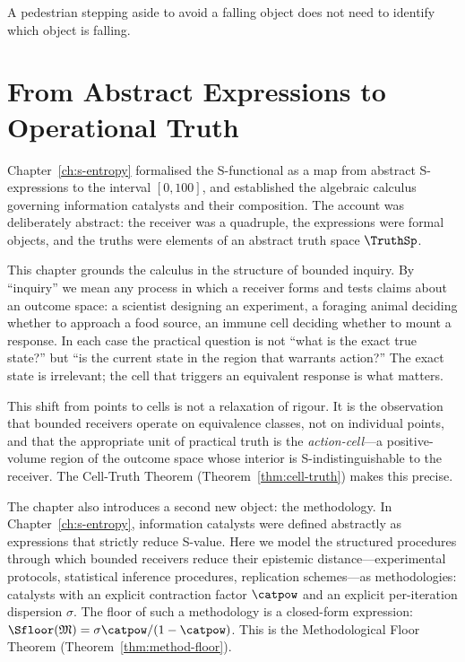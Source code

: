 \epigraph{A pedestrian stepping aside to avoid a falling object does not need to identify which object is falling.}{}


\section{From Abstract Expressions to Operational Truth}
\label{sec:ch2-intro}

Chapter~\ref{ch:s-entropy} formalised the S-functional as a map from abstract S-expressions to the interval $[0, 100]$, and established the algebraic calculus governing information catalysts and their composition. The account was deliberately abstract: the receiver was a quadruple, the expressions were formal objects, and the truths were elements of an abstract truth space $\TruthSp$.

This chapter grounds the calculus in the structure of bounded inquiry. By ``inquiry'' we mean any process in which a receiver forms and tests claims about an outcome space: a scientist designing an experiment, a foraging animal deciding whether to approach a food source, an immune cell deciding whether to mount a response. In each case the practical question is not ``what is the exact true state?'' but ``is the current state in the region that warrants action?'' The exact state is irrelevant; the cell that triggers an equivalent response is what matters.

This shift from points to cells is not a relaxation of rigour. It is the observation that bounded receivers operate on equivalence classes, not on individual points, and that the appropriate unit of practical truth is the \emph{action-cell}---a positive-volume region of the outcome space whose interior is S-indistinguishable to the receiver. The Cell-Truth Theorem (Theorem~\ref{thm:cell-truth}) makes this precise.

The chapter also introduces a second new object: the methodology. In Chapter~\ref{ch:s-entropy}, information catalysts were defined abstractly as expressions that strictly reduce S-value. Here we model the structured procedures through which bounded receivers reduce their epistemic distance---experimental protocols, statistical inference procedures, replication schemes---as methodologies: catalysts with an explicit contraction factor $\catpow$ and an explicit per-iteration dispersion $\sigma$. The floor of such a methodology is a closed-form expression: $\Sfloor(\Meth) = \sigma\catpow/(1-\catpow)$. This is the Methodological Floor Theorem (Theorem~\ref{thm:method-floor}).

